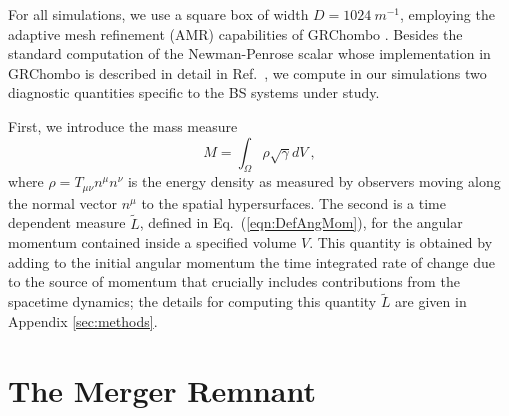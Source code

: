 \documentclass[aps,twocolumn,nofootinbib,superscriptaddress,amsfonts,floatfix
]{revtex4-1} %
\begin{document}
For all simulations, we use a square box of width $D = 1024~m^{-1}$, employing the adaptive mesh refinement (AMR) capabilities of GRChombo \cite{Radia:2021smk,Andrade:2021rbd,Clough:2015sqa}. Besides the standard computation of the Newman-Penrose scalar
whose implementation in GRChombo is described in detail in
Ref.~\cite{Radia:2021smk}, we compute in our simulations
two diagnostic quantities specific to the BS systems under study.

First, we introduce the mass measure 
 \begin{equation}
    M = \int_{\Omega} \rho \sqrt{\gamma} dV~,\label{eqn:Massmeasure}
\end{equation}
where $\rho = T_{\mu\nu}n^{\mu}n^{\nu}$ is the energy density as measured
by observers moving along the normal vector $n^\mu$ to the
spatial hypersurfaces. 
The second
is a time dependent
measure $\tilde{L}$, defined in Eq.~(\ref{eqn:DefAngMom}),
for the angular momentum contained
inside a specified volume $V$. This quantity is obtained
by adding to the initial angular momentum the time integrated
rate of change due to the source of momentum that crucially
includes contributions from the spacetime dynamics; the details
for computing this quantity $\tilde{L}$ are given in
Appendix \ref{sec:methods}.

\section{The Merger Remnant}\label{sec:Remannt}
\end{document}
